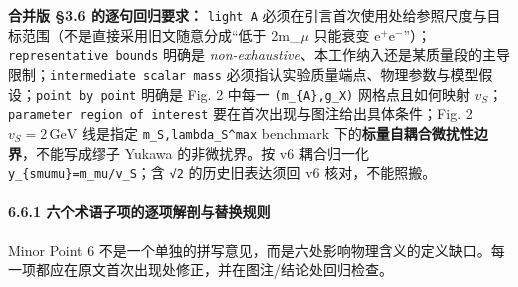 \documentclass[
  chinese,
  UTF8]{ctexart}
\begin{document}
\textbf{合并版 §3.6 的逐句回归要求：}
\texttt{light\ A\textquotesingle{}}
必须在引言首次使用处给参照尺度与目标范围（不是直接采用旧文随意分成``低于
2m\_\ensuremath{\mu} 只能衰变
e\ensuremath{^+}e\ensuremath{^-}''）；\texttt{representative\ bounds}
明确是
\emph{non-exhaustive}、本工作纳入还是某质量段的主导限制；\texttt{intermediate\ scalar\ mass}
必须指认实验质量端点、物理参数与模型假设；\texttt{point\ by\ point}
明确是 Fig. 2 中每一 \texttt{(m\_\{A\textquotesingle{}\},g\_X)}
网格点且如何映射 \(v_S\)；\texttt{parameter\ region\ of\ interest}
要在首次出现与图注给出具体条件；Fig. 2 \(v_S=2\,\mathrm{GeV}\) 线是指定
\texttt{m\_S,lambda\_S\^{}max} benchmark
下的\textbf{标量自耦合微扰性边界}，不能写成缪子 Yukawa 的非微扰界。按 v6
耦合归一化 \texttt{y\_\{smumu\}=m\_mu/v\_S}；含 \texttt{√2}
的历史旧表达须回 v6 核对，不能照搬。

\paragraph{6.6.1
六个术语子项的逐项解剖与替换规则}\label{ux516dux4e2aux672fux8bedux5b50ux9879ux7684ux9010ux9879ux89e3ux5256ux4e0eux66ffux6362ux89c4ux5219}

Minor Point 6
不是一个单独的拼写意见，而是六处影响物理含义的定义缺口。每一项都应在原文首次出现处修正，并在图注/结论处回归检查。
\end{document}
